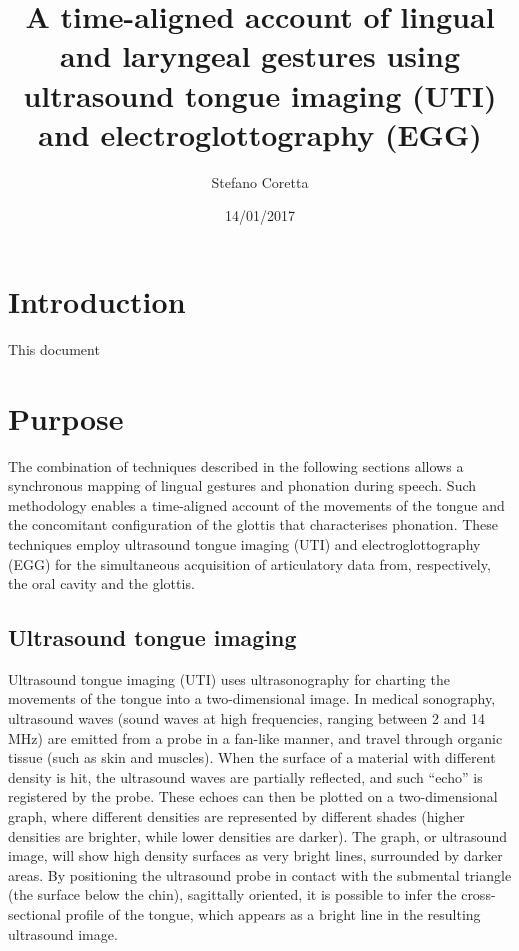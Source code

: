 \documentclass[11pt,A4paper,]{article}
\title{A time-aligned account of lingual and laryngeal gestures using
ultrasound tongue imaging (UTI) and electroglottography (EGG)}
\author{Stefano Coretta}
\date{14/01/2017}
\begin{document}
\maketitle

{
\setcounter{tocdepth}{2}
\tableofcontents
}
\section{Introduction}\label{introduction}

This document

\section{Purpose}\label{purpose}

The combination of techniques described in the following sections allows
a synchronous mapping of lingual gestures and phonation during speech.
Such methodology enables a time-aligned account of the movements of the
tongue and the concomitant configuration of the glottis that
characterises phonation. These techniques employ ultrasound tongue
imaging (UTI) and electroglottography (EGG) for the simultaneous
acquisition of articulatory data from, respectively, the oral cavity and
the glottis.

\subsection{Ultrasound tongue imaging}\label{ultrasound-tongue-imaging}

Ultrasound tongue imaging (UTI) uses ultrasonography for charting the
movements of the tongue into a two-dimensional image. In medical
sonography, ultrasound waves (sound waves at high frequencies, ranging
between 2 and 14 MHz) are emitted from a probe in a fan-like manner, and
travel through organic tissue (such as skin and muscles). When the
surface of a material with different density is hit, the ultrasound
waves are partially reflected, and such ``echo'' is registered by the
probe. These echoes can then be plotted on a two-dimensional graph,
where different densities are represented by different shades (higher
densities are brighter, while lower densities are darker). The graph, or
ultrasound image, will show high density surfaces as very bright lines,
surrounded by darker areas. By positioning the ultrasound probe in
contact with the submental triangle (the surface below the chin),
sagittally oriented, it is possible to infer the cross-sectional profile
of the tongue, which appears as a bright line in the resulting
ultrasound image.
\end{document}
